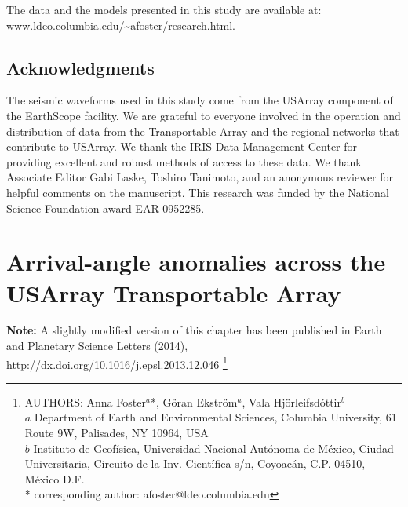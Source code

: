 \documentclass[12pt,oneside]{book}
\begin{document}
The data and the models presented in this study are available at:\\ \url{www.ldeo.columbia.edu/~afoster/research.html}. 
 
\section*{Acknowledgments}
The seismic waveforms used in this study come from the USArray component of the EarthScope facility. We are grateful to everyone involved in the operation and distribution of data from the Transportable Array and the regional networks that contribute to USArray. We thank the IRIS Data Management Center for providing excellent and robust methods of access to these data. We thank Associate Editor Gabi Laske, Toshiro Tanimoto, and an anonymous reviewer for helpful comments on the manuscript. This research was funded by the National Science Foundation award EAR-0952285. 


\singlespacing
\chapter{Arrival-angle anomalies across the USArray Transportable Array}
\label{ch:aa}
\thispagestyle{fancy}
\doublespacing

\begin{raggedright}
{\bf Note:} A slightly modified version of this chapter has been published in Earth and Planetary Science Letters (2014), http://dx.doi.org/10.1016/j.epsl.2013.12.046
\footnote{AUTHORS: Anna Foster$^{a}$*, G\"oran Ekstr\"om$^{a}$, Vala Hj\"orleifsd\'ottir$^{b}$\\
$a$ Department of Earth and Environmental Sciences, Columbia University, 61 Route 9W, Palisades, NY 10964, USA\\
$b$ Instituto de Geof\'{i}sica, Universidad Nacional Aut\'{o}noma de M\'{e}xico, 
Ciudad Universitaria, Circuito de la Inv. Cient\'{i}fica s/n, Coyoac\'{a}n, C.P. 04510, M\'{e}xico D.F.\\
* corresponding author:  afoster@ldeo.columbia.edu}
\end{raggedright}
\normalsize
\end{document}
